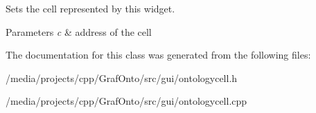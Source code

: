\-Sets the cell represented by this widget. 


\begin{DoxyParams}{\-Parameters}
{\em c} & address of the cell \\
\hline
\end{DoxyParams}


\-The documentation for this class was generated from the following files\-:\begin{DoxyCompactItemize}
\item 
/media/projects/cpp/\-Graf\-Onto/src/gui/ontologycell.\-h\item 
/media/projects/cpp/\-Graf\-Onto/src/gui/ontologycell.\-cpp\end{DoxyCompactItemize}

